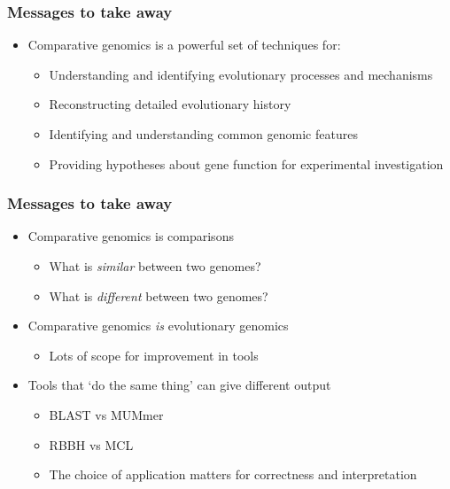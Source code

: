 \begin{frame}
  \frametitle{Messages to take away}
  \begin{itemize}
    \item   \textcolor{hutton_green}{Comparative genomics is a powerful set of techniques for:}
    \begin{itemize}
      \item Understanding and identifying evolutionary processes and mechanisms
      \item Reconstructing detailed evolutionary history
      \item Identifying and understanding common genomic features
      \item Providing hypotheses about gene function for experimental investigation
    \end{itemize}
  \end{itemize}
\end{frame}

\begin{frame}
  \frametitle{Messages to take away}
  \begin{itemize}
    \item \textcolor{hutton_green}{Comparative genomics is comparisons}
    \begin{itemize}
      \item What is \textit{similar} between two genomes?
      \item What is \textit{different} between two genomes?
    \end{itemize}
    \item \textcolor{hutton_blue}{Comparative genomics \textit{is} evolutionary genomics}
    \begin{itemize}
      \item Lots of scope for improvement in tools
    \end{itemize}
    \item \textcolor{hutton_purple}{Tools that `do the same thing' can give different output}
    \begin{itemize}
      \item BLAST vs MUMmer
      \item RBBH vs MCL
      \item The choice of application matters for correctness and interpretation
    \end{itemize}
  \end{itemize}
\end{frame}
